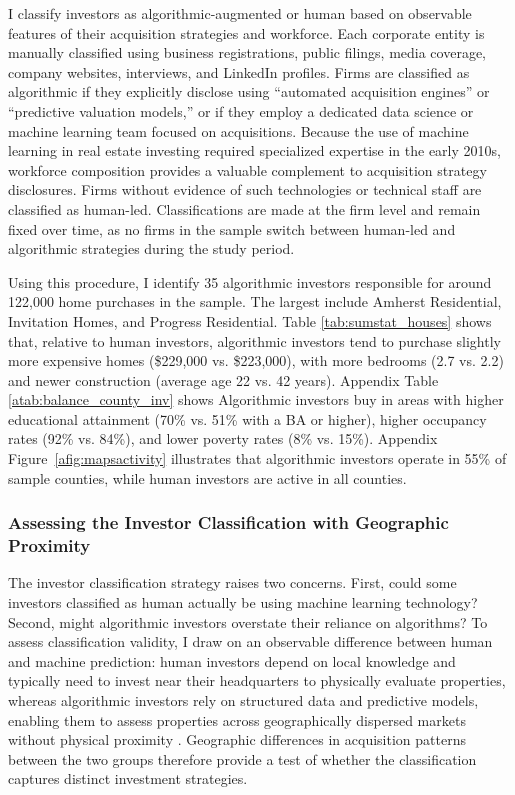 \documentclass[11pt]{article}
\begin{document}
I classify investors as algorithmic-augmented or human based on observable features of their acquisition strategies and workforce. Each corporate entity is manually classified using business registrations, public filings, media coverage, company websites, interviews, and LinkedIn profiles. Firms are classified as algorithmic if they explicitly disclose using ``automated acquisition engines'' or ``predictive valuation models,'' or if they employ a dedicated data science or machine learning team focused on acquisitions. Because the use of machine learning in real estate investing required specialized expertise in the early 2010s, workforce composition provides a valuable complement to acquisition strategy disclosures. Firms without evidence of such technologies or technical staff are classified as human-led. Classifications are made at the firm level and remain fixed over time, as no firms in the sample switch between human-led and algorithmic strategies during the study period.

 
Using this procedure, I identify 35 algorithmic investors responsible for around 122,000 home purchases in the sample. The largest include Amherst Residential, Invitation Homes, and Progress Residential. Table \ref{tab:sumstat_houses} shows that, relative to human investors, algorithmic investors tend to purchase slightly more expensive homes (\$229,000 vs. \$223,000), with more bedrooms (2.7 vs. 2.2) and newer construction (average age 22 vs. 42 years). Appendix Table \ref{atab:balance_county_inv} shows Algorithmic investors buy in areas with higher educational attainment (70\% vs. 51\% with a BA or higher), higher occupancy rates (92\% vs. 84\%), and lower poverty rates (8\% vs. 15\%). Appendix Figure~\ref{afig:mapsactivity} illustrates that algorithmic investors operate in 55\% of sample counties, while human investors are active in all counties.

\subsubsection{Assessing the Investor Classification with Geographic Proximity}
The investor classification strategy raises two concerns. First, could some investors classified as human actually be using machine learning technology? Second, might algorithmic investors overstate their reliance on algorithms? To assess classification validity, I draw on an observable difference between human and machine prediction: human investors depend on local knowledge and typically need to invest near their headquarters to physically evaluate properties, whereas algorithmic investors rely on structured data and predictive models, enabling them to assess properties across geographically dispersed markets without physical proximity \citep{fields2018a}. Geographic differences in acquisition patterns between the two groups therefore provide a test of whether the classification captures distinct investment strategies.
\end{document}
